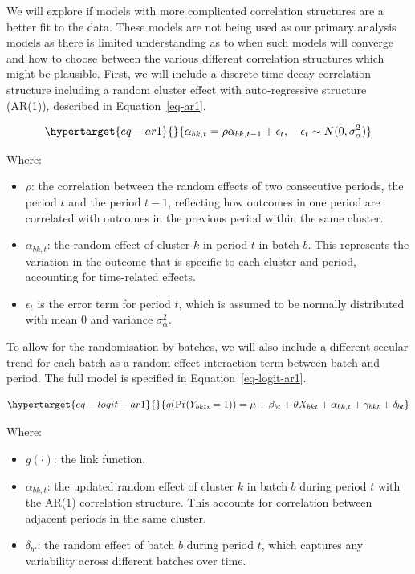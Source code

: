 \documentclass[
]{scrartcl}
\providecommand{\tightlist}{%
  \setlength{\itemsep}{0pt}\setlength{\parskip}{0pt}}\usepackage{longtable,booktabs,array}
\begin{document}
We will explore if models with more complicated correlation structures
are a better fit to the data. These models are not being used as our
primary analysis models as there is limited understanding as to when
such models will converge and how to choose between the various
different correlation structures which might be plausible. First, we
will include a discrete time decay correlation structure including a
random cluster effect with auto-regressive structure (AR(1)), described
in Equation~\ref{eq-ar1}.

\begin{equation}\protect\hypertarget{eq-ar1}{}{
\alpha_{bk, t} = \rho \alpha_{bk, t-1} + \epsilon_{t}, \quad \epsilon_{t} \sim N(0, \sigma^2_\alpha)
}\label{eq-ar1}\end{equation}

Where:

\begin{itemize}
\tightlist
\item
  \(\rho\): the correlation between the random effects of two
  consecutive periods, the period \(t\) and the period \(t-1\),
  reflecting how outcomes in one period are correlated with outcomes in
  the previous period within the same cluster.
\item
  \(\alpha_{bk, t}\): the random effect of cluster \(k\) in period \(t\)
  in batch \(b\). This represents the variation in the outcome that is
  specific to each cluster and period, accounting for time-related
  effects.
\item
  \(\epsilon_{t}\) is the error term for period \(t\), which is assumed
  to be normally distributed with mean 0 and variance
  \(\sigma^2_\alpha\).
\end{itemize}

To allow for the randomisation by batches, we will also include a
different secular trend for each batch as a random effect interaction
term between batch and period. The full model is specified in
Equation~\ref{eq-logit-ar1}.

\begin{equation}\protect\hypertarget{eq-logit-ar1}{}{
g(\text{Pr}(Y_{bkti} = 1)) = \mu + \beta_{bt} + \theta X_{bkt} + \alpha_{bk,t} + \gamma_{bkt} + \delta_{bt}
}\label{eq-logit-ar1}\end{equation}

Where:

\begin{itemize}
\tightlist
\item
  \(g(\cdot)\): the link function.
\item
  \(\alpha_{bk,t}\): the updated random effect of cluster \(k\) in batch
  \(b\) during period \(t\) with the AR(1) correlation structure. This
  accounts for correlation between adjacent periods in the same cluster.
\item
  \(\delta_{bt}\): the random effect of batch \(b\) during period \(t\),
  which captures any variability across different batches over time.
\end{itemize}
\end{document}

